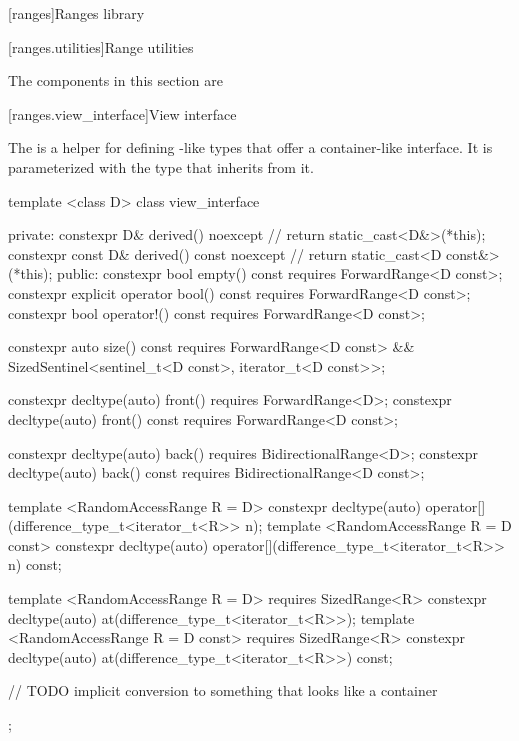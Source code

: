 
\setcounter{chapter}{9}
[ranges]{Ranges library}


\setcounter{section}{6}
[ranges.utilities]{Range utilities}

\pnum
The components in this section are 

[ranges.view_interface]{View interface}

\pnum
The  is a helper for defining -like types that offer a
container-like interface. It is parameterized with the type that inherits from it.

%
\begin{codeblock}
template <class D>
class view_interface {
private:
  constexpr D& derived() noexcept { // \expos
    return static_cast<D&>(*this);
  }
  constexpr const D& derived() const noexcept { // \expos
    return static_cast<D const&>(*this);
  }
public:
  constexpr bool empty() const requires ForwardRange<D const>;
  constexpr explicit operator bool() const requires ForwardRange<D const>;
  constexpr bool operator!() const requires ForwardRange<D const>;

  constexpr auto size() const requires ForwardRange<D const> &&
    SizedSentinel<sentinel_t<D const>, iterator_t<D const>>;

  constexpr decltype(auto) front() requires ForwardRange<D>;
  constexpr decltype(auto) front() const requires ForwardRange<D const>;

  constexpr decltype(auto) back() requires BidirectionalRange<D>;
  constexpr decltype(auto) back() const requires BidirectionalRange<D const>;

  template <RandomAccessRange R = D>
  constexpr decltype(auto) operator[](difference_type_t<iterator_t<R>> n);
  template <RandomAccessRange R = D const>
  constexpr decltype(auto) operator[](difference_type_t<iterator_t<R>> n) const;

  template <RandomAccessRange R = D>
    requires SizedRange<R>
  constexpr decltype(auto) at(difference_type_t<iterator_t<R>>);
  template <RandomAccessRange R = D const>
    requires SizedRange<R>
  constexpr decltype(auto) at(difference_type_t<iterator_t<R>>) const;

  // TODO implicit conversion to something that looks like a container
};
\end{codeblock}

